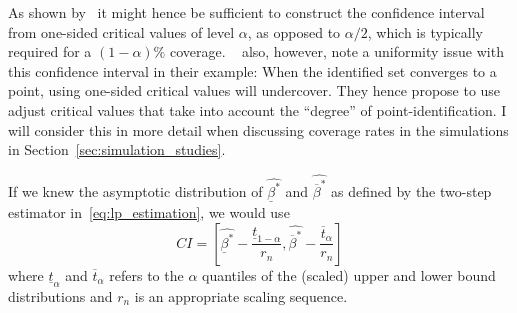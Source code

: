 \documentclass[12pt,a4paper,english]{article} %
\numberwithin{equation}{section}
\theoremstyle{definition}
\theoremstyle{remark}
\theoremstyle{plain}
\begin{document}
As shown by~\cite{imbens2004confidence} it might hence be sufficient to construct the confidence interval from one-sided critical values of level $\alpha$, as opposed to $\alpha/2$, which is typically required for a $(1-\alpha)\%$ coverage.
~\cite{imbens2004confidence} also, however, note a uniformity issue with this confidence interval in their example: When the identified set converges to a point, using one-sided critical values will undercover.
They hence propose to use adjust critical values that take into account the ``degree'' of point-identification.
I will consider this in more detail when discussing coverage rates in the simulations in Section~\ref{sec:simulation_studies}.


If we knew the asymptotic distribution of $\hat{\underline{\beta}^*}$ and $\hat{\overline{\beta}^*}$ as defined by the two-step estimator in~\ref{eq:lp_estimation}, we would use
\begin{equation*}
  CI = \left[\hat{\underline{\beta}^*} - \frac{\underline{t}_{1-\alpha}}{r_n}, \hat{\overline{\beta}^*} - \frac{\overline{t}_{\alpha}}{r_n}\right]
\end{equation*}
where $\underline{t}_\alpha$ and $\overline{t}_\alpha$ refers to the $\alpha$ quantiles of the (scaled) upper and lower bound distributions and $r_n$ is an appropriate scaling sequence.

\end{document}
